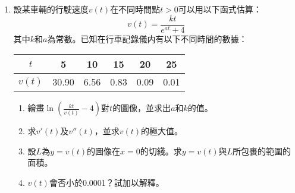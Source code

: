 \documentclass[12pt]{article}
\begin{document}
\begin{enumerate}
\begin{enumerate}
        \end{enumerate}
        \item 設某車輛的行駛速度$v(t)$在不同時間點$t>0$可以用以下函式估算：$$v(t)=\frac{kt}{e^{at}+4}$$ 其中$k$和$a$為常數。已知在行車記錄儀内有以下不同時間的數據：\begin{center}
            \begin{tabular}{|c|c|c|c|c|c|}
                \hline
                $t$&5&10&15&20&25\\
                \hline
                $v(t)$&30.90&6.56&0.83&0.09&0.01\\
                \hline
            \end{tabular}
        \end{center}\begin{enumerate}
            \item 繪畫$\displaystyle\ln(\frac{kt}{v(t)}-4)$對$t$的圖像，並求出$a$和$k$的值。
            \item 求$v'(t)$及$v''(t)$，並求$v(t)$的極大值。
            \item 設$L$為$y=v(t)$的圖像在$x=0$的切綫。求$y=v(t)$與$L$所包裹的範圍的面積。
            \item $v(t)$會否小於0.0001？試加以解釋。
        \end{enumerate}
    \end{enumerate}
\end{document}
